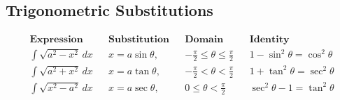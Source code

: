 \subsection{Trigonometric Substitutions}
\begin{align*}
    \textbf{Expression} && \textbf{Substitution} && \textbf{Domain} && \textbf{Identity} \\
    \int \sqrt{a^2-x^2} \, dx &&  x = a \sin \theta, && -\frac{\pi}{2} \leq \theta \leq \frac{\pi}{2} && 1 - \sin^2 \theta = \cos^2 \theta \\
    \int \sqrt{a^2+x^2} \, dx &&  x = a \tan \theta, && -\frac{\pi}{2} < \theta < \frac{\pi}{2} && 1 + \tan^2 \theta = \sec^2 \theta \\
    \int \sqrt{x^2-a^2} \, dx &&  x = a \sec \theta, && 0 \leq \theta < \frac{\pi}{2} && \sec^2 \theta - 1 = \tan^2 \theta 
\end{align*}